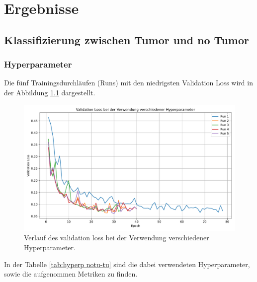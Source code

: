 \chapter{Ergebnisse}

\section{Klassifizierung zwischen Tumor und no Tumor}

\subsection{Hyperparameter}
Die fünf Trainingsdurchläufen (Runs) mit den niedrigsten Validation Loss wird in der Abbildung \ref{fig:val_loss notu-tu} dargestellt.
\begin{figure}[H]
  \centering
  \includegraphics[scale=0.4]{plots/Val_loss_noTu_Tu.pdf}
  \caption{Verlauf des validation loss bei der Verwendung verschiedener Hyperparameter.}
  \label{fig:val_loss notu-tu}
\end{figure}
In der Tabelle \ref{tab:hyperp notu-tu} sind die dabei verwendeten Hyperparameter, sowie die aufgenommen Metriken zu finden. 
\begin{table}[H]
    \centering
  \caption{Die fünf Runs mit dem niedrigsten validation loss sowie deren verwendete Hyperparameter und aufgezeichnete Metriken.}
  \label{tab:hyperp notu-tu}
\end{table}
